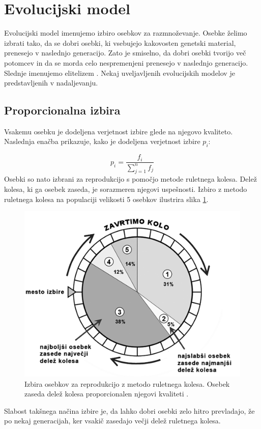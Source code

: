 \documentclass[a4paper, 12pt]{book}
\begin{document}
\section{Evolucijski model}
Evolucijski model imenujemo izbiro osebkov za razmno\v zevanje.
Osebke \v zelimo izbrati tako, da se dobri osebki, ki vsebujejo kakovosten genetski material, prenesejo v naslednjo generacijo. Zato je smiselno, da dobri osebki tvorijo ve\v c potomcev in da se morda celo nespremenjeni prenesejo v naslednjo generacijo. Slednje imenujemo elitelizem \cite{inteligentni sistemi}. Nekaj uveljavljenih evolucijskih modelov je predstavljenih v nadaljevanju.

\subsection{Proporcionalna izbira}
\label{seq:ruletno kolo}
Vsakemu osebku je dodeljena verjetnost izbire glede na njegovo kvaliteto. Naslednja ena\v cba prikazuje, kako je dodeljena verjetnost izbire $p_i$:

\begin{equation}
p_i = \frac{f_i}{\sum_{j=1}^n f_j}
\label{eq:proporcionalna izbira}
\end{equation}
Osebki so nato izbrani za reprodukcijo s pomo\v cjo metode ruletnega kolesa. Dele\v z kolesa, ki ga osebek zaseda, je sorazmeren njegovi uspe\v snosti. Izbiro z metodo ruletnega kolesa na populaciji velikosti 5 osebkov ilustrira slika \ref{ruletno kolo}.

\begin{figure}[h]
\begin{center}
\includegraphics[scale=0.65]{ruletno_kolo.png}
\end{center}
\caption{Izbira osebkov za reprodukcijo z metodo ruletnega kolesa. Osebek zaseda dele\v z kolesa proporcionalen njegovi kvaliteti \cite{slika ruletno kolo}.}
\label{ruletno kolo}
\end{figure}
Slabost tak\v snega na\v cina izbire je, da lahko dobri osebki zelo hitro prevladajo, \v ze po nekaj generacijah, ker vsaki\v c zasedajo ve\v cji dele\v z ruletnega kolesa.
\end{document}
